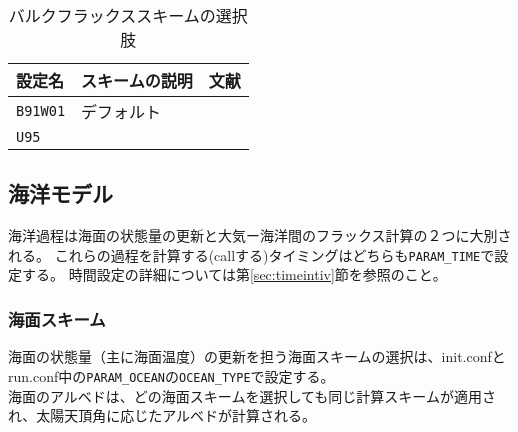 \begin{table}[h]
\begin{center}
  \caption{バルクフラックススキームの選択肢}
  \label{tab:nml_bulk}
  \begin{tabularx}{150mm}{llX} \hline
    \rowcolor[gray]{0.9}  設定名 & スキームの説明 & 文献 \\ \hline
      \verb|B91W01| & デフォルト & \citet{beljaars_1991,wilson_2001} \\
      \verb|U95|    &          & \citet{uno_1995} \\
    \hline
  \end{tabularx}
\end{center}
\end{table}



\subsection{海洋モデル} \label{sec:basic_ocean}
海洋過程は海面の状態量の更新と大気ー海洋間のフラックス計算の２つに大別される。
これらの過程を計算する(callする)タイミングはどちらも\verb|PARAM_TIME|で設定する。
時間設定の詳細については第\ref{sec:timeintiv}節を参照のこと。\\


\subsubsection{海面スキーム}
海面の状態量（主に海面温度）の更新を担う海面スキームの選択は、init.confとrun.conf中の\verb|PARAM_OCEAN|の\verb|OCEAN_TYPE|で設定する。\\
海面のアルベドは、どの海面スキームを選択しても同じ計算スキームが適用され、太陽天頂角に応じたアルベドが計算される。

\\

